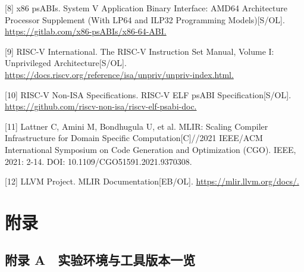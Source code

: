 \documentclass[UTF8,a4paper,10pt]{ctexart}
\begin{document}
[8] x86 psABIs. System V Application Binary Interface: AMD64 Architecture Processor Supplement (With LP64 and ILP32 Programming Models)[S/OL]. \url{https://gitlab.com/x86-psABIs/x86-64-ABI.}

[9] RISC-V International. The RISC-V Instruction Set Manual, Volume I: Unprivileged Architecture[S/OL]. \url{https://docs.riscv.org/reference/isa/unpriv/unpriv-index.html.}

[10] RISC-V Non-ISA Specifications. RISC-V ELF psABI Specification[S/OL]. \url{https://github.com/riscv-non-isa/riscv-elf-psabi-doc.}


[11] Lattner C, Amini M, Bondhugula U, et al. MLIR: Scaling Compiler Infrastructure for Domain Specific Computation[C]//2021 IEEE/ACM International Symposium on Code Generation and Optimization (CGO). IEEE, 2021: 2-14. DOI: 10.1109/CGO51591.2021.9370308.

[12] LLVM Project. MLIR Documentation[EB/OL]. \url{https://mlir.llvm.org/docs/.}

\newpage
\section{附录}
\subsection{附录 A　实验环境与工具版本一览}
\end{document}
